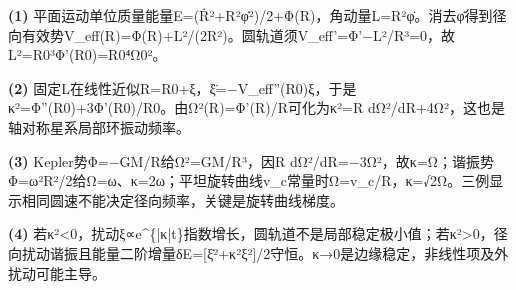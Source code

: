 \par\noindent\textbf{(1)} 平面运动单位质量能量E=(Ṙ²+R²φ̇²)/2+Φ(R)，角动量L=R²φ̇。消去φ̇得到径向有效势V\_eff(R)=Φ(R)+L²/(2R²)。圆轨道须V\_eff'=Φ'−L²/R³=0，故L²=R0³Φ'(R0)=R0⁴Ω0²。
\par\noindent\textbf{(2)} 固定L在线性近似R=R0+ξ，ξ̈=−V\_eff''(R0)ξ，于是κ²=Φ''(R0)+3Φ'(R0)/R0。由Ω²(R)=Φ'(R)/R可化为κ²=R dΩ²/dR+4Ω²，这也是轴对称星系局部环振动频率。
\par\noindent\textbf{(3)} Kepler势Φ=−GM/R给Ω²=GM/R³，因R dΩ²/dR=−3Ω²，故κ=Ω；谐振势Φ=ω²R²/2给Ω=ω、κ=2ω；平坦旋转曲线v\_c常量时Ω=v\_c/R，κ=√2Ω。三例显示相同圆速不能决定径向频率，关键是旋转曲线梯度。
\par\noindent\textbf{(4)} 若κ²<0，扰动ξ∝e\textasciicircum{}\{|κ|t\}指数增长，圆轨道不是局部稳定极小值；若κ²>0，径向扰动谐振且能量二阶增量δE=[ξ̇²+κ²ξ²]/2守恒。κ→0是边缘稳定，非线性项及外扰动可能主导。
